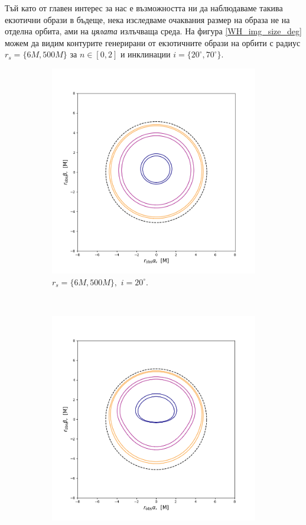 Тъй като от главен интерес за нас е възможността ни да наблюдаваме такива екзотични образи в бъдеще, нека изследваме очаквания размер на образа не на отделна орбита, ами на \emph{цялата} излъчваща среда. На фигура \ref{WH_img_size_deg} можем да видим контурите генерирани от екзотичните образи на орбити с радиус $r_s = \{6M, 500M\}$ за $n\in[0,2]$ и инклинации $i = \{20^\circ,70^\circ\}$.

\begin{figure}[!htb]
	\begin{subfigure}{6cm}
		\includegraphics[scale = 0.3]{WH_20_deg_r6_r500.png}
		\caption{$r_s = \{6M, 500M\},\,\, i = 20^\circ$.}
	\end{subfigure}\,\,\,
	\begin{subfigure}{6cm}
		\includegraphics[scale = 0.3]{WH_70_deg_r6_r500.png}

\end{subfigure}
\end{figure}
